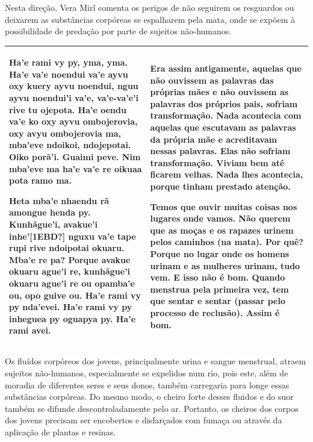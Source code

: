 Nesta direção, Vera Mirĩ comenta os perigos de não seguirem os
resguardos ou deixarem as substâncias corpóreas se espalharem pela
mata, onde se expõem à possibilidade de predação por parte de sujeitos
não-humanos. 

\begin{flushleft}
\tablehead{}
\begin{supertabular}{m{2.87756in}|m{2.87886in}}
Ha’e rami vy py, yma, yma. Ha’e va’e noendui va’e ayvu oxy kuery ayvu
noendui, nguu ayvu noendui’i va’e, va’e-va’e’i rive tu ojepota. Ha’e
oendu va’e ko oxy ayvu ombojerovia, oxy avyu ombojerovia ma, mba’eve
ndoikoi, ndojepotai. Oiko porã’i. Guaimi peve. Nim mba’eve ma ha’e va’e
re oikuaa pota ramo ma. 

Heta mba’e nhaendu rã amongue henda py. Kunhãgue’i, avakue’i
inhe’[1EBD?] nguxu va’e tape rupi rive ndoipotai okuaru. Mba’e re pa?
Porque avakue okuaru ague’i re, kunhãgue’i okuaru ague’i re ou opamba’e
ou, opo guive ou.  Ha’e rami vy py nda’evei. Ha’e rami vy py inheguea
py oguapya py. Ha’e rami avei.  &
Era assim antigamente, aquelas que não ouvissem as palavras das próprias
mães e não ouvissem as palavras dos próprios pais, sofriam
transformação. Nada acontecia com aquelas que escutavam as palavras da
própria mãe e acreditavam nessas palavras. Elas não sofriam
transformação. Viviam bem até ficarem velhas. Nada lhes acontecia,
porque tinham prestado atenção. 

Temos que ouvir muitas coisas nos lugares onde vamos. Não querem que as
moças e os rapazes urinem pelos caminhos (na mata). Por quê? Porque no
lugar onde os homens urinam e as mulheres urinam, tudo
vem\footnotemark{}. E isso não é bom. Quando menstrua pela primeira
vez, tem que sentar e sentar (passar pelo processo de reclusão). Assim
é bom. \\\hline
\end{supertabular}
\end{flushleft}
Os fluídos corpóreos dos jovens, principalmente urina e sangue
menstrual, atraem sujeitos não-humanos, especialmente se expelidos num
rio, pois este, além de moradia de diferentes seres e seus donos,
também carregaria para longe essas substâncias corpóreas. Do mesmo
modo, o cheiro forte desses fluidos e do suor também se difunde
descontroladamente pelo ar. Portanto, os cheiros dos corpos dos jovens
precisam ser encobertos e disfarçados com fumaça ou através da
aplicação de plantas e resinas. 

